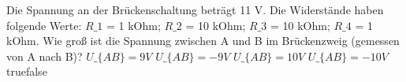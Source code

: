     {Die Spannung an der Brückenschaltung beträgt 11 V. Die Widerstände haben folgende Werte: $R\_1$ = 1 kOhm; $R\_2$ = 10 kOhm; $R\_3$ = 10 kOhm; $R\_4$ = 1 kOhm. Wie groß ist die Spannung zwischen A und B im Brückenzweig (gemessen von A nach B)?}
    {$U\_\{AB\} = 9 V$ }
    {$U\_\{AB\} = -9 V$}
    {$U\_\{AB\} = 10 V$}
    {$U\_\{AB\} = -10 V$}
    {true}{false}